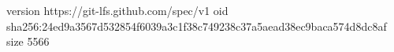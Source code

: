 version https://git-lfs.github.com/spec/v1
oid sha256:24ed9a3567d532854f6039a3c1f38c749238c37a5aead38ec9baca574d8dc8af
size 5566
